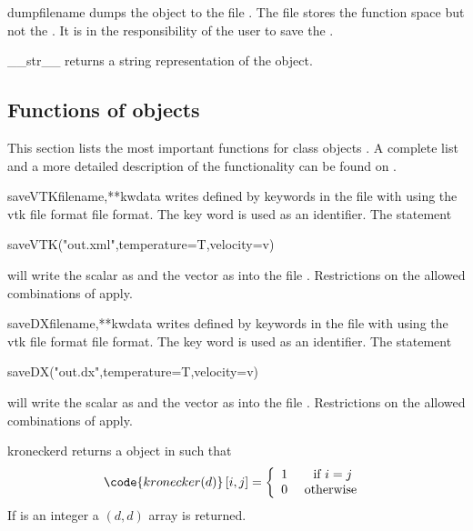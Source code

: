 \begin{methoddesc}[Data]{dump}{filename}
dumps the \Data object to the file . The file stores the
function space but not the \Domain. It is in the responsibility of the user to
save the \Domain. 
\end{methoddesc}

\begin{methoddesc}[Data]{__str__}{}
returns a string representation of the object.
\end{methoddesc}

\subsection{Functions of \Data objects}
This section lists the most important functions for \Data class objects .
A complete list and a more detailed description of the functionality can be found on \ReferenceGuide.
\begin{funcdesc}{saveVTK}{filename,**kwdata}
writes \Data defined by keywords in the file with  using the 
vtk file format \VTK file format. The key word is used as an identifier. The statement
\begin{python}
  saveVTK("out.xml",temperature=T,velocity=v)
\end{python} 
will write the scalar  as  and the vector  as   into the 
file . Restrictions on the allowed combinations of \FunctionSpace apply.
\end{funcdesc}
\begin{funcdesc}{saveDX}{filename,**kwdata}
writes \Data defined by keywords in the file with  using the 
vtk file format \OpenDX file format. The key word is used as an identifier. The statement
\begin{python}
  saveDX("out.dx",temperature=T,velocity=v)
\end{python} 
will write the scalar  as  and the vector  as   into the 
file . Restrictions on the allowed combinations of \FunctionSpace apply.
\end{funcdesc}
\begin{funcdesc}{kronecker}{d}
returns a \RankTwo \Data object in \FunctionSpace {} such that
\begin{equation}
\code{kronecker(d)}\left[ i,j\right] = \left\{ 
\begin{array}{cc}
1 & \mbox{ if } i=j \\
0 & \mbox{ otherwise }
\end{array}
\right.
\end{equation}
If  is an integer a $(d,d)$ \numpy array is returned.
\end{funcdesc}
